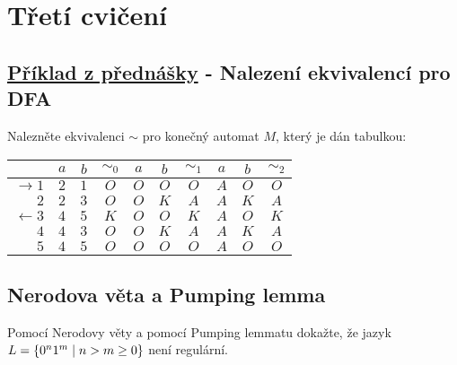 \section{Třetí cvičení}

\subsection{\href{https://youtu.be/sA8ZXlhjbIo?list=PLQL6z4JeTTQkLuzI78OTnfYBclE1g0UjS&t=712}{Příklad z přednášky} - Nalezení ekvivalencí pro DFA}

Nalezněte ekvivalenci $\sim$ pro konečný automat $M$, který je dán tabulkou:

\begin{multicols}{2}
    \begin{tabular}{|r|c c|c|c c|c|c c|c|}
        \hline
        & $a$ & $b$ & $\sim_0$ & $a$ & $b$ & $\sim_1$ & $a$ & $b$ & $\sim_2$ \\ \hline \hline
        $\rightarrow 1$& $2$ & $1$ & $O$ & $O$ & $O$ & $O$ & $A$ & $O$ & $O$ \\
        $2$            & $2$ & $3$ & $O$ & $O$ & $K$ & $A$ & $A$ & $K$ & $A$ \\
        $\leftarrow 3$ & $4$ & $5$ & $K$ & $O$ & $O$ & $K$ & $A$ & $O$ & $K$ \\
        $4$            & $4$ & $3$ & $O$ & $O$ & $K$ & $A$ & $A$ & $K$ & $A$ \\
        $5$            & $4$ & $5$ & $O$ & $O$ & $O$ & $O$ & $A$ & $O$ & $O$ \\
        \hline
    \end{tabular}
\columnbreak

\end{multicols}

\subsection{Nerodova věta a Pumping lemma}
Pomocí Nerodovy věty a pomocí Pumping lemmatu dokažte, že jazyk $L = \left\lbrace 0^n 1^m \mid n > m \geq 0 \right\rbrace$ není regulární.

